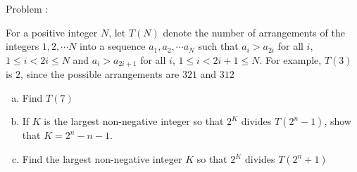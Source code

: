 Problem : 

For a positive integer $N$, let $T(N)$ denote the number of arrangements of the integers $1, 2, \cdots N$ into a sequence $a_1, a_2, \cdots a_N$ such that $a_i > a_{2i}$ for all $i$, $1 \le i < 2i \le N$ and $a_i > a_{2i+1}$ for all $i$, $1 \le i < 2i+1 \le N$. For example, $T(3)$ is $2$, since the possible arrangements are $321$ and $312$
\begin{enumerate}[(a)]
  \item Find $T(7)$
  \item If $K$ is the largest non-negative integer so that $2^K$ divides $T(2^n - 1)$, show that $K = 2^n - n - 1$.
  \item Find the largest non-negative integer $K$ so that $2^K$ divides $T(2^n + 1)$
\end{enumerate}
